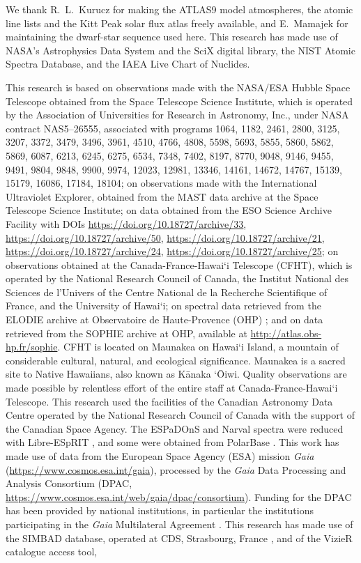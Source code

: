 \documentclass[final,5p]{elsarticle}
\begin{document}
\begin{acknowledgments}
We thank R.~L.~Kurucz for making the ATLAS9 model atmospheres, the atomic line lists and the Kitt Peak solar flux atlas freely available, and E.~Mamajek for maintaining the dwarf-star sequence used here. This research has made use of NASA's Astrophysics Data System and the SciX digital library, the NIST Atomic Spectra Database, and the IAEA Live Chart of Nuclides.

This research is based on observations made with the NASA/ESA Hubble Space Telescope obtained from the Space Telescope Science Institute, which is operated by the Association of Universities for Research in Astronomy, Inc., under NASA contract NAS5--26555, associated with programs 1064, 1182, 2461, 2800, 3125, 3207, 3372, 3479, 3496, 3961, 4510, 4766, 4808, 5598, 5693, 5855, 5860, 5862, 5869, 6087, 6213, 6245, 6275, 6534, 7348, 7402, 8197, 8770, 9048, 9146, 9455, 9491, 9804, 9848, 9900, 9974, 12023, 12981, 13346, 14161, 14672, 14767, 15139, 15179, 16086, 17184, 18104; on observations made with the International Ultraviolet Explorer, obtained from the MAST data archive at the Space Telescope Science Institute; on data obtained from the ESO Science Archive Facility with DOIs \url{https://doi.org/10.18727/archive/33}, \url{https://doi.org/10.18727/archive/50}, \url{https://doi.org/10.18727/archive/21}, \url{https://doi.org/10.18727/archive/24}, \url{https://doi.org/10.18727/archive/25}; on observations obtained at the Canada-France-Hawai{\textquoteleft}i Telescope (CFHT), which is operated by the National Research Council of Canada, the Institut National des Sciences de l'Univers of the Centre National de la Recherche Scientifique of France, and the University of Hawai{\textquoteleft}i; on spectral data retrieved from the ELODIE archive at Observatoire de Haute-Provence (OHP) \citep{Moultaka2004}; and on data retrieved from the SOPHIE archive at OHP, available at \url{http://atlas.obs-hp.fr/sophie}. CFHT is located on Maunakea on Hawai{\textquoteleft}i Island, a mountain of considerable cultural, natural, and ecological significance. Maunakea is a sacred site to Native Hawaiians, also known as K\={a}naka {\textquoteleft}\={O}iwi. Quality observations are made possible by relentless effort of the entire staff at Canada-France-Hawai{\textquoteleft}i Telescope. This research used the facilities of the Canadian Astronomy Data Centre operated by the National Research Council of Canada with the support of the Canadian Space Agency. The ESPaDOnS and Narval spectra were reduced with Libre-ESpRIT \citep{Donati1997}, and some were obtained from PolarBase \citep{Petit2014}. This work has made use of data from the European Space Agency (ESA) mission {\it Gaia} (\url{https://www.cosmos.esa.int/gaia}), processed by the {\it Gaia} Data Processing and Analysis Consortium (DPAC, \url{https://www.cosmos.esa.int/web/gaia/dpac/consortium}). Funding for the DPAC has been provided by national institutions, in particular the institutions participating in the {\it Gaia} Multilateral Agreement \citep{GaiaCollaboration2016, GaiaCollaboration2023}. This research has made use of the SIMBAD database, operated at CDS, Strasbourg, France \citep{Wenger2000}, and of the VizieR catalogue access tool, 
\end{acknowledgments}
\end{document}

